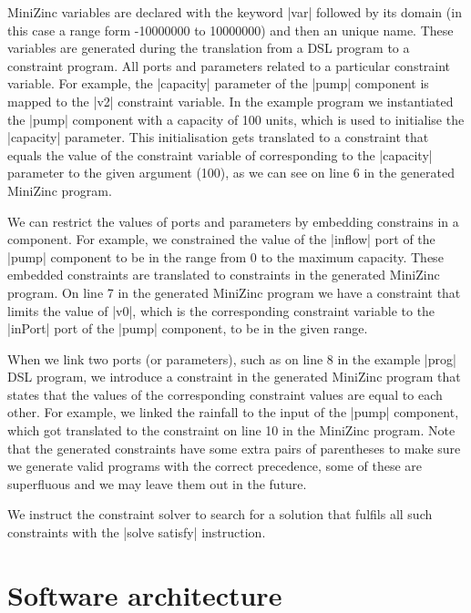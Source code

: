 \documentclass{article}
\begin{document}
MiniZinc variables are declared with the keyword |var| followed by its domain
(in this case a range form -10000000 to 10000000) and then an unique name. These
variables are generated during the translation from a DSL program to a
constraint program. All ports and parameters related to a particular constraint
variable. For example, the |capacity| parameter of the |pump| component is
mapped to the |v2| constraint variable. In the example program we instantiated
the |pump| component with a capacity of 100 units, which is used to initialise the
|capacity| parameter. This initialisation gets translated to a constraint that
equals the value of the constraint variable of corresponding to the |capacity| 
parameter to the given argument (100), as we can see on line 6 in the generated
MiniZinc program.

We can restrict the values of ports and parameters by embedding constrains in a
component. For example, we constrained the value of the |inflow| port of the
|pump| component to be in the range from 0 to the maximum capacity. These
embedded constraints are translated to constraints in the generated MiniZinc
program. On line 7 in the generated MiniZinc program we have a constraint that
limits the value of |v0|, which is the corresponding constraint variable to the
|inPort| port of the |pump| component, to be in the given range.


When we link two ports (or parameters), such as on line 8 in the
example |prog| DSL program, we introduce a constraint in the generated MiniZinc
program that states that the values of the corresponding constraint values
are equal to each other. For example, we linked the rainfall to the input of
the |pump| component, which got translated to the constraint on line 10 in the
MiniZinc program. Note that the generated constraints have some extra pairs of
parentheses to make sure we generate valid programs with the correct precedence,
some of these are superfluous and we may leave them out in the future.

We instruct the constraint solver to search for a solution that fulfils all such
constraints with the |solve satisfy| instruction. 




\section{Software architecture}
\label{sec:architecture}
\end{document}
